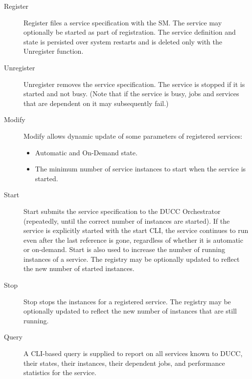     \begin{description}
        \item[Register] Register files a service specification with the SM. The service may optionally
          be started as part of registration. The service definition and state is persisted over system
          restarts and is deleted only with the Unregister function.
          
        \item[Unregister] Unregister removes the service specification. The service is stopped if it is
          started and not busy. (Note that if the service is busy, jobs and services that are dependent
          on it may subsequently fail.)
          
        \item[Modify] Modify allows dynamic update of some parameters of registered services:
            \begin{itemize}
              \item Automatic and On-Demand state.
              \item The minimum number of service instances to start when the service is started.  
            \end{itemize}

        \item[Start] Start submits the service specification to the DUCC Orchestrator (repeatedly,
          until the correct number of instances are started). If the service is explicitly started
          with the start CLI, the service continues to run even after the last reference is gone,
          regardless of whether it is automatic or on-demand. Start is also used to increase the
          number of running instances of a service. The registry may be optionally updated to
          reflect the new number of started instances.
          
        \item[Stop] Stop stops the instances for a registered service. The registry may be
          optionally updated to reflect the new number of instances that are still running.

        \item[Query] A CLI-based query is supplied to report on all services known to DUCC, their
          states, their instances, their dependent jobs, and performance statistics for the service.
    \end{description}
        
